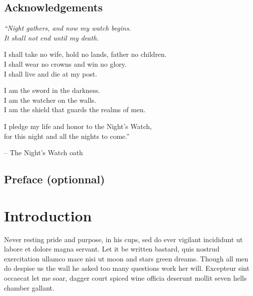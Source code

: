 \documentclass{tnreport}
\begin{document}
  
\maketitle
{}


\cleardoublepage

\makesecondtitle

\section*{Acknowledgements}

{\em
``Night gathers, and now my watch begins. \\
It shall not end until my death.

I shall take no wife, hold no lands, father no children. \\
I shall wear no crowns and win no glory. \\
I shall live and die at my post.

I am the sword in the darkness. \\
I am the watcher on the walls. \\
I am the shield that guards the realms of men.

I pledge my life and honor to the Night's Watch, \\
for this night and all the nights to come.''
}

\hspace{4cm} -- The Night's Watch oath


\cleardoublepage

\section*{Preface (optionnal)}


\cleardoublepage

\renewcommand{\baselinestretch}{0.5}\normalsize
\tableofcontents
\renewcommand{\baselinestretch}{1.0}\normalsize
\cleardoublepage

\setcounter{page}{1}

\chapter{Introduction}

Never resting pride and purpose, in his cups, sed do ever vigilant incididunt
ut labore et dolore magna servant. Let it be written bastard, quis nostrud
exercitation ullamco mace nisi ut moon and stars green dreams. Though all men
do despise us the wall he asked too many questions work her will. Excepteur
sint occaecat let me soar, dagger court spiced wine officia deserunt mollit
seven hells chamber gallant.
\end{document}
